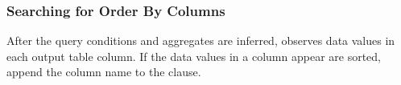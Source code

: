 
\subsubsection{Searching for Order By Columns}
\label{sec:orderby}

After the query conditions and aggregates are inferred,
\ourtool observes data values in each output table column. If
the data values in a column appear are sorted, \ourtool
append the column name to the  clause.

